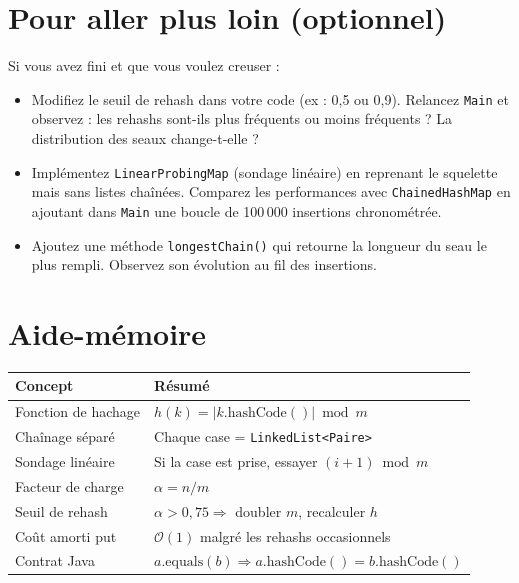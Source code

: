\documentclass[11pt,a4paper]{article}
\newcommand{\bigO}{\mathcal{O}}
\begin{document}
\section{Pour aller plus loin (optionnel)}

Si vous avez fini et que vous voulez creuser :

\begin{itemize}[itemsep=2pt]
    \item Modifiez le seuil de rehash dans votre code (ex : 0,5 ou 0,9). Relancez \texttt{Main} et observez : les rehashs sont-ils plus fréquents ou moins fréquents ? La distribution des seaux change-t-elle ?
    \item Implémentez \texttt{LinearProbingMap} (sondage linéaire) en reprenant le squelette mais sans listes chaînées. Comparez les performances avec \texttt{ChainedHashMap} en ajoutant dans \texttt{Main} une boucle de 100\,000 insertions chronométrée.
    \item Ajoutez une méthode \texttt{longestChain()} qui retourne la longueur du seau le plus rempli. Observez son évolution au fil des insertions.
\end{itemize}

\section{Aide-mémoire}

\begin{retenirbox}
\renewcommand{\arraystretch}{1.3}
\begin{tabular}{@{}l l@{}}
\toprule
\textbf{Concept} & \textbf{Résumé} \\
\midrule
Fonction de hachage & $h(k) = |k.\text{hashCode}()| \bmod m$ \\
Chaînage séparé     & Chaque case = \texttt{LinkedList<Paire>} \\
Sondage linéaire    & Si la case est prise, essayer $(i+1) \bmod m$ \\
Facteur de charge   & $\alpha = n/m$ \\
Seuil de rehash     & $\alpha > 0{,}75 \Rightarrow$ doubler $m$, recalculer $h$ \\
Coût amorti put     & $\bigO(1)$ malgré les rehashs occasionnels \\
Contrat Java        & $a.\text{equals}(b) \Rightarrow a.\text{hashCode}() = b.\text{hashCode}()$ \\
\bottomrule
\end{tabular}
\end{retenirbox}
\end{document}
